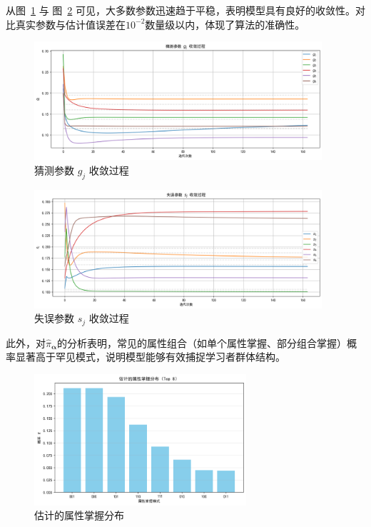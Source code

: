 \documentclass[a4paper,12pt]{ctexart} %
\begin{document}
从图~\ref{fig:gj_convergence} 与 图~\ref{fig:sj_convergence} 可见，大多数参数迅速趋于平稳，表明模型具有良好的收敛性。对比真实参数与估计值误差在$10^{-2}$数量级以内，体现了算法的准确性。

\begin{figure}[H]
    \centering
    \includegraphics[width=0.95\textwidth]{fig/DINA_g.png}
    \caption{猜测参数 $g_j$ 收敛过程}
    \label{fig:gj_convergence}
\end{figure}

\begin{figure}[H]
    \centering
    \includegraphics[width=0.95\textwidth]{fig/DINA_s.png}
    \caption{失误参数 $s_j$ 收敛过程}
    \label{fig:sj_convergence}
\end{figure}

此外，对$\hat{\pi}_{\boldsymbol{\alpha}}$的分析表明，常见的属性组合（如单个属性掌握、部分组合掌握）概率显著高于罕见模式，说明模型能够有效捕捉学习者群体结构。

\begin{figure}[H]
    \centering
    \includegraphics[width=0.7\textwidth]{fig/DINA_state.png}
    \caption{估计的属性掌握分布}
    \label{fig:pi_distribution}
\end{figure}
\end{document}
